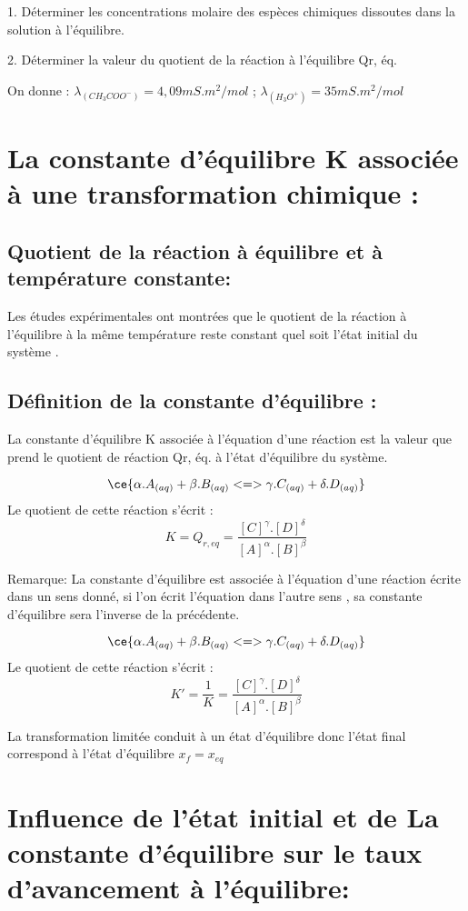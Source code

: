 \documentclass[12pt]{article}
\begin{document}
1. Déterminer les concentrations molaire des espèces chimiques dissoutes dans la solution à l'équilibre.

2. Déterminer la valeur du quotient de la réaction à l'équilibre Qr, éq.

On donne : $\lambda_{(CH_3COO^-)} = 4,09mS.m^2/mol$ ; $\lambda_{(H_3O^+)} = 35mS.m^2/mol$

\section{La constante d'équilibre K associée à une  transformation chimique : }
\subsection{Quotient de la réaction à équilibre et à température constante:}
Les études expérimentales ont montrées que le quotient de la réaction à l'équilibre à la même température
reste constant quel soit l'état initial du système .

\subsection{Définition de la constante d'équilibre : }
La constante d'équilibre K associée à l'équation d'une réaction est la valeur que prend le quotient de réaction
Qr, éq. à l'état d'équilibre du système.


$$\ce{\alpha.A_{(aq)} + \beta.B_{(aq)} <=> \gamma.C_{(aq)} + \delta.D_{(aq)}}$$
Le quotient de cette réaction  s'écrit : $$K =Q_{r,eq} = \frac{[C]^{\gamma}.[D]^{\delta}}{[A]^{\alpha}.[B]^{\beta}}$$



\begin{tcolorbox}
	Remarque:
La constante d'équilibre est associée à l'équation d'une réaction écrite dans un sens donné, si l'on
écrit l'équation dans l'autre sens , sa constante d'équilibre sera l'inverse de la précédente.


$$\ce{\alpha.A_{(aq)} + \beta.B_{(aq)} <=> \gamma.C_{(aq)} + \delta.D_{(aq)}}$$
Le quotient de cette réaction  s'écrit : $$K' = \frac{1}{K} = \frac{[C]^{\gamma}.[D]^{\delta}}{[A]^{\alpha}.[B]^{\beta}}$$


La transformation limitée conduit à un état d’équilibre donc l'état final correspond à l’état d'équilibre $x_f = x_{eq}$

\end{tcolorbox}


\section{Influence de l'état initial et de La constante d'équilibre sur le taux d'avancement à  l'équilibre: }
\end{document}
